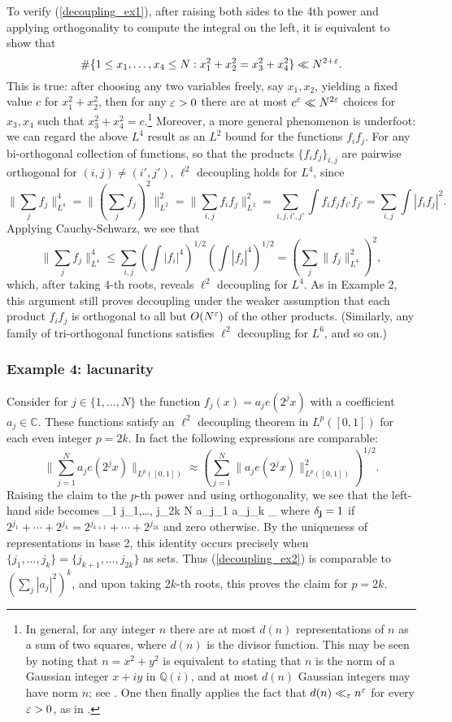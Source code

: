 \documentclass[brochure,english,12pt]{bourbaki}%
\newcommand{\C}{\mathbb{C}}
\begin{document}
To verify (\ref{decoupling_ex1}), after raising both sides to the 4th power and applying orthogonality to compute the integral on the left, it is equivalent to show that
\[ \# \{ 1 \leq x_1,\ldots,x_4 \leq N: x_1^2 + x_2^2  = x_3^2 + x_4^2 \} \ll N^{2+\varepsilon}.\]
This is true: after choosing any two variables freely, say $x_1,x_2$, yielding a fixed value $c$ for $x_1^2 + x_2^2$, then for any $\varepsilon>0$ there are at most $c^\varepsilon \ll N^{2\varepsilon}$ choices for $x_3, x_4$ such that $x_3^2 + x_4^2 = c$.\footnote{In general, for any integer $n$ there are at most $d(n)$ representations of $n$ as a sum of two squares, where $d(n)$ is the divisor function. This may be seen by noting that $n=x^2+y^2$ is equivalent to stating that $n$ is the norm of a Gaussian integer $x+iy$ in $\mathbb{Q}(i)$, and at most $d(n)$ Gaussian integers may have norm $n$; see \cite[Lemma 4.2]{Nar80}. One then finally applies the fact that $d(n)\ll_\varepsilon n^\varepsilon$ for every $\varepsilon>0$, as in \cite[Thm. 315]{HarWri75}.
} 
Moreover, a more general phenomenon is underfoot: we can regard the above $L^4$ result as an $L^2$ bound for the functions $f_i f_j$. For any bi-orthogonal collection of functions, so that the products $\{f_if_j\}_{i,j}$ are pairwise orthogonal for $(i,j) \neq (i',j')$, $\ell^2$ decoupling holds for $L^4$, since
\[ \| \sum_{j} f_j \|^4_{L^4} = \| ( \sum_{j} f_j)^2 \|^2_{L^2} = \| \sum_{i,j} f_{i} f_j \|^2_{L^2} =  \sum_{i,j,i',j'}  \int f_if_j \overline{f_{i'}f_{j'}} = \sum_{i,j} \int |f_if_j|^2 .
\]
Applying Cauchy-Schwarz, we see that
\[ \| \sum_{j} f_j \|^4_{L^4}\leq \sum_{i,j} (\int |f_i|^4 )^{1/2} (\int |f_j|^4 )^{1/2}   = ( \sum_j \|f_j\|_{L^4}^2)^2,
\] 
which, after taking $4$-th roots, reveals $\ell^2$ decoupling for $L^4$. 
As in Example 2, this argument still proves decoupling under the weaker assumption that each product $f_if_j$ is orthogonal to all but $O(N^\varepsilon)$ of the other products. (Similarly, any family of tri-orthogonal functions satisfies $\ell^2$ decoupling for $L^6$, and so on.)

\subsubsection{Example 4: lacunarity}
Consider for $j \in \{1,\ldots, N\}$ the function $f_j(x) = a_j e(2^j x)$ with a coefficient $a_j \in \C$. These  functions satisfy an $\ell^2$ decoupling theorem  in $L^p([0,1])$ for each even integer $p=2k$.
In fact the following expressions are comparable:
\[ \| \sum_{j=1}^N a_j e(2^j x) \|_{L^p([0,1])} \approx ( \sum_{j=1}^N \| a_j e(2^j x) \|_{L^p([0,1])}^2)^{1/2}.\]
Raising the claim  to the $p$-th power and using  orthogonality, we see that the left-hand side becomes 
\beq\label{decoupling_ex2}
\sum_{1 \leq j_1,\ldots, j_{2k} \leq N} a_{j_1} \cdots a_{j_k} \cdots {} \del_{}
\eeq
where $\delta_{\mathbf{j}}=1$ if $2^{j_1} + \cdots + 2^{j_{k}} = 2^{j_{k+1}} + \cdots+ 2^{j_{2k}}$ and zero otherwise.
By the uniqueness of representations in base 2, this identity occurs precisely when $\{j_1,\ldots, j_k\} = \{j_{k+1},\ldots, j_{2k}\}$ as sets. Thus  (\ref{decoupling_ex2}) is comparable to $(\sum_{j} |a_j|^2)^k$, and upon taking $2k$-th roots, this proves the claim for $p=2k$. 
\end{document}
